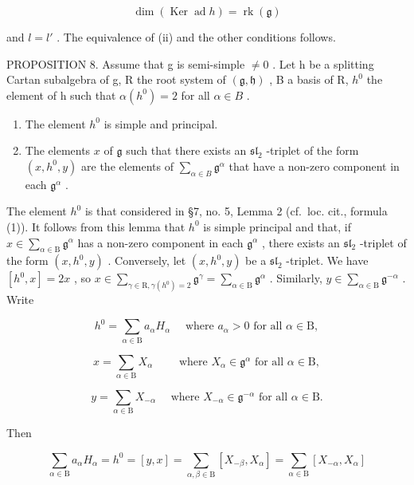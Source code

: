 \[
\dim (\operatorname{Ker} \operatorname{ad} h) = \operatorname{rk} (\mathfrak {g})
\]

and \(l = l'\) . The equivalence of (ii) and the other conditions follows.

PROPOSITION 8. Assume that g is semi-simple \(\neq 0\) . Let h be a splitting Cartan subalgebra of g, R the root system of \((\mathfrak{g},\mathfrak{h})\) , B a basis of R, \(h^{0}\) the element of h such that \(\alpha(h^{0}) = 2\) for all \(\alpha \in B\) .

\begin{enumerate}
\def\labelenumi{(\roman{enumi})}
\item
  The element \(h^0\) is simple and principal.
\item
  The elements \(x\) of \(\mathfrak{g}\) such that there exists an \(\mathfrak{sl}_2\) -triplet of the form \((x, h^0, y)\) are the elements of \(\sum_{\alpha \in B} \mathfrak{g}^\alpha\) that have a non-zero component in each \(\mathfrak{g}^\alpha\) .
\end{enumerate}

The element \(h^0\) is that considered in §7, no. 5, Lemma 2 (cf.~loc. cit., formula (1)). It follows from this lemma that \(h^0\) is simple principal and that, if \(x \in \sum_{\alpha \in \mathrm{B}} \mathfrak{g}^\alpha\) has a non-zero component in each \(\mathfrak{g}^\alpha\) , there exists an \(\mathfrak{sl}_2\) -triplet of the form \((x, h^0, y)\) . Conversely, let \((x, h^0, y)\) be a \(\mathfrak{sl}_2\) -triplet. We have \([h^0, x] = 2x\) , so \(x \in \sum_{\gamma \in \mathrm{R}, \gamma(h^0) = 2} \mathfrak{g}^\gamma = \sum_{\alpha \in \mathrm{B}} \mathfrak{g}^\alpha\) . Similarly, \(y \in \sum_{\alpha \in \mathrm{B}} \mathfrak{g}^{-\alpha}\) . Write

\[
h ^ {0} = \sum_ {\alpha \in \mathrm{B}} a _ {\alpha} H _ {\alpha} \quad \text { where } a _ {\alpha} > 0 \text { for all } \alpha \in \mathrm{B},
\]

\[
x = \sum_ {\alpha \in \mathrm{B}} X _ {\alpha} \qquad \text { where } X _ {\alpha} \in \mathfrak {g} ^ {\alpha} \text { for   all } \alpha \in \mathrm{B},
\]

\[
y = \sum_ {\alpha \in \mathrm{B}} X _ {- \alpha} \quad \text { where } X _ {- \alpha} \in \mathfrak {g} ^ {- \alpha} \text { for   all } \alpha \in \mathrm{B}.
\]

Then

\[
\sum_ {\alpha \in \mathrm{B}} a _ {\alpha} H _ {\alpha} = h ^ {0} = [ y, x ] = \sum_ {\alpha , \beta \in \mathrm{B}} [ X _ {- \beta}, X _ {\alpha} ] = \sum_ {\alpha \in \mathrm{B}} [ X _ {- \alpha}, X _ {\alpha} ]
\]

